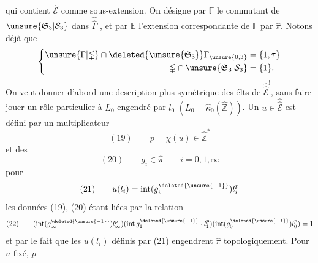 qui contient $\hat{\mathcal E}$ comme sous-extension. On désigne par $\mathbb\Gamma$ le commutant de $\unsure{\mathfrak S_3|\mathcal S_3}$ dans $\widehat{\widehat\Gamma}$ , et par $\mathbb E$ l'extension correspondante de $\mathbb\Gamma$ par $\hat\pi$. Notons déjà que
\[
\left\{\begin{aligned}
\unsure{\Gamma|\mathbb\Gamma}\cap\deleted{\unsure{\mathfrak S_3}}\Gamma_{\unsure{0,3}}&=\{1,\tau\}\\
\mathbb\Gamma\cap\unsure{\mathfrak S_3|\mathcal S_3}&=\{1\}.
\end{aligned}\right.
\]
On veut donner d'abord une description plus symétrique des élts de $\widehat{\widehat{\mathcal E}}^!$, sans faire jouer un rôle particulier à $L_0$ engendré par $l_0$ $(L_0=\hat\kappa_0(\hat{\mathbb Z}))$. Un $u\in\widehat{\widehat{\mathcal E}}$ est  défini par un multiplicateur
\[
(19)\qquad p=\chi(u)\in\hat{\mathbb Z}^{*}
\]
et des
\[
(20)\qquad g_i\in\hat\pi\qquad i=0,1,\infty
\]
pour
\[
(21)\qquad u(l_i)=\operatorname{int}(g_i^{\deleted{\unsure{-1}}})l_i^p
\]
les données (19), (20) étant liées par la relation
\[
(22)\qquad(\operatorname{int}(g_\infty^{\deleted{\unsure{-1}}})l_\infty^p)
(\operatorname{int}g_1^{\deleted{\unsure{-1}}}\cdot l_1^p)
(\operatorname{int}(g_0^{\deleted{\unsure{-1}}})l_0^p)=1
\]
et par le fait que les $u(l_i)$ définis par (21) \uline{engendrent} $\hat\pi$ topologiquement. Pour $u$ fixé, $p$
